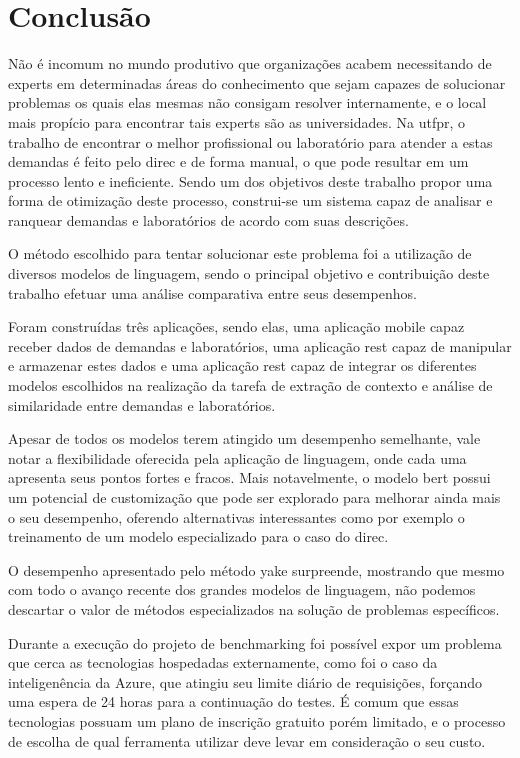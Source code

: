 \chapter{Conclusão}\label{cap:conclusoes}

Não é incomum no mundo produtivo que organizações acabem necessitando de experts em determinadas áreas do conhecimento que sejam capazes de solucionar problemas os quais elas mesmas não consigam resolver internamente, e o local mais propício para encontrar tais experts são as universidades. Na \gls{utfpr}, o trabalho de encontrar o melhor profissional ou laboratório para atender a estas demandas é feito pelo \gls{direc} e de forma manual, o que pode resultar em um processo lento e ineficiente. Sendo um dos objetivos deste trabalho propor uma forma de otimização deste processo, construi-se um sistema capaz de analisar e ranquear demandas e laboratórios de acordo com suas descrições.

O método escolhido para tentar solucionar este problema foi a utilização de diversos modelos de linguagem, sendo o principal objetivo e contribuição deste trabalho efetuar uma análise comparativa entre seus desempenhos.

Foram construídas três aplicações, sendo elas, uma aplicação mobile capaz receber dados de demandas e laboratórios, uma aplicação \gls{rest} capaz de manipular e armazenar estes dados e uma aplicação \gls{rest} capaz de integrar os diferentes modelos escolhidos na realização da tarefa de extração de contexto e análise de similaridade entre demandas e laboratórios.

Apesar de todos os modelos terem atingido um desempenho semelhante, vale notar a flexibilidade oferecida pela aplicação de linguagem, onde cada uma apresenta seus pontos fortes e fracos. Mais notavelmente, o modelo \gls{bert} possui um potencial de customização que pode ser explorado para melhorar ainda mais o seu desempenho, oferendo alternativas interessantes como por exemplo o treinamento de um modelo especializado para o caso do \gls{direc}.

O desempenho apresentado pelo método \gls{yake} surpreende, mostrando que mesmo com todo o avanço recente dos grandes modelos de linguagem, não podemos descartar o valor de métodos especializados na solução de problemas específicos.

Durante a execução do projeto de benchmarking foi possível expor um problema que cerca as tecnologias hospedadas externamente, como foi o caso da inteligenência da Azure, que atingiu seu limite diário de requisições, forçando uma espera de 24 horas para a continuação do testes. É comum que essas tecnologias possuam um plano de inscrição gratuito porém limitado, e o processo de escolha de qual ferramenta utilizar deve levar em consideração o seu custo. 

